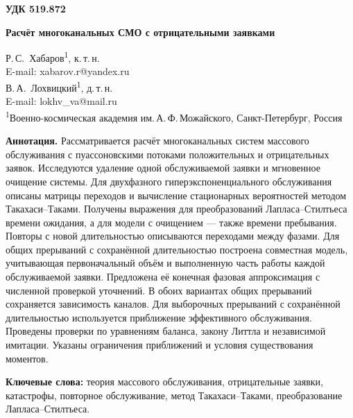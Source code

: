 

\noindent\textbf{УДК 519.872}
\vspace{1em}

\begin{center}
{\Large\bfseries Расчёт многоканальных СМО с отрицательными заявками}
\end{center}
\vspace{0.8em}

\begin{center}
Р.\,С.~Хабаров\textsuperscript{1}, к.\,т.\,н.\\[2pt]
E-mail: xabarov.r@yandex.ru\\[6pt]
В.\,А.~Лохвицкий\textsuperscript{1}, д.\,т.\,н.\\[2pt]
E-mail: lokhv\_va@mail.ru\\[8pt]
{\small\textsuperscript{1}Военно-космическая академия им.\,А.\,Ф.\,Можайского, Санкт-Петербург, Россия}
\end{center}
\vspace{0.5em}

\noindent\textbf{Аннотация.} 
Рассматривается расчёт многоканальных систем массового обслуживания с пуассоновскими потоками положительных и отрицательных заявок. Исследуются удаление одной обслуживаемой заявки и мгновенное очищение системы. Для двухфазного гиперэкспоненциального обслуживания описаны матрицы переходов и вычисление стационарных вероятностей методом Такахаси--Таками. Получены выражения для преобразований Лапласа--Стилтьеса времени ожидания, а для модели с очищением --- также времени пребывания. Повторы с новой длительностью описываются переходами между фазами. Для общих прерываний с сохранённой длительностью построена совместная модель, учитывающая первоначальный объём и выполненную часть работы каждой обслуживаемой заявки. Предложена её конечная фазовая аппроксимация с численной проверкой уточнений. В обоих вариантах общих прерываний сохраняется зависимость каналов. Для выборочных прерываний с сохранённой длительностью используется приближение эффективного обслуживания. Проведены проверки по уравнениям баланса, закону Литтла и независимой имитации. Указаны ограничения приближений и условия существования моментов.

\textbf{Ключевые слова:} теория массового обслуживания, отрицательные заявки, катастрофы, повторное обслуживание, метод Такахаси--Таками, преобразование Лапласа--Стилтьеса.

